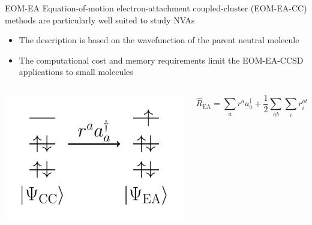 \documentclass[9pt,t,xcolor=table]{beamer}
\begin{document}
\begin{frame}{\huge EOM-EA}\large
	Equation-of-motion electron-attachment coupled-cluster (EOM-EA-CC) methods are particularly well suited to study NVAs
	\vspace{5pt}
	\begin{itemize}
		\item The description is based on the wavefunction of the parent neutral molecule
		\item The computational cost and memory requirements limit the EOM-EA-CCSD applications to small molecules
	\end{itemize}
	\begin{columns}
		\begin{column}{0.4\textwidth}
			\vspace{5pt}
			\includegraphics[width=\textwidth]{Figs/EAdiag.pdf}
		\end{column}

		\begin{column}{0.60\textwidth}
			\vspace{25pt} \centering
			\[ \hat{R}_{\mathrm{EA}} = \sum_{a} r^a a_a^\dagger + \frac{1}{2} \sum_{ab} \sum_{i} r_{i}^{ab} a_a^\dagger a_i a_b^\dagger + \dots \]
		\end{column}	
	\end{columns}
\end{frame}
\end{document}
